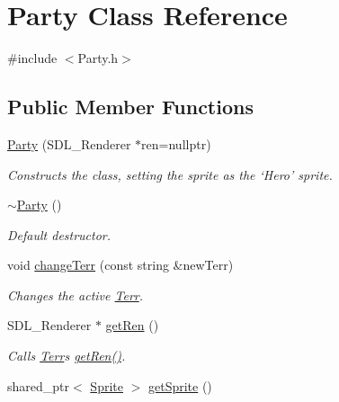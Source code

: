 \hypertarget{class_party}{}\section{Party Class Reference}
\label{class_party}


{\ttfamily \#include $<$Party.\+h$>$}

\subsection*{Public Member Functions}
\begin{DoxyCompactItemize}
\item 
\hyperlink{class_party_a2ac633ed4c5b4171c463a6db02048291}{Party} (S\+D\+L\+\_\+\+Renderer $\ast$ren=nullptr)\hypertarget{class_party_a2ac633ed4c5b4171c463a6db02048291}{}\label{class_party_a2ac633ed4c5b4171c463a6db02048291}

\begin{DoxyCompactList}\small\item\em Constructs the class, setting the sprite as the ‘\+Hero’ sprite. \end{DoxyCompactList}\item 
\hyperlink{class_party_a85aa837e38a06690e6fee5087d7c7ad7}{$\sim$\+Party} ()\hypertarget{class_party_a85aa837e38a06690e6fee5087d7c7ad7}{}\label{class_party_a85aa837e38a06690e6fee5087d7c7ad7}

\begin{DoxyCompactList}\small\item\em Default destructor. \end{DoxyCompactList}\item 
void \hyperlink{class_party_a5b4e7bc4d910ad64722629b2fe365240}{change\+Terr} (const string \&new\+Terr)\hypertarget{class_party_a5b4e7bc4d910ad64722629b2fe365240}{}\label{class_party_a5b4e7bc4d910ad64722629b2fe365240}

\begin{DoxyCompactList}\small\item\em Changes the active \hyperlink{class_terr}{Terr}. \end{DoxyCompactList}\item 
S\+D\+L\+\_\+\+Renderer $\ast$ \hyperlink{class_party_acd791a319c74dcc757fc13c961795688}{get\+Ren} ()\hypertarget{class_party_acd791a319c74dcc757fc13c961795688}{}\label{class_party_acd791a319c74dcc757fc13c961795688}

\begin{DoxyCompactList}\small\item\em Calls \hyperlink{class_terr}{Terr}\textquotesingle{}s \hyperlink{class_party_acd791a319c74dcc757fc13c961795688}{get\+Ren()}. \end{DoxyCompactList}\item 
shared\+\_\+ptr$<$ \hyperlink{class_sprite}{Sprite} $>$ \hyperlink{class_party_a7f8bf409daa7750d0ce103841c437f27}{get\+Sprite} ()\hypertarget{class_party_a7f8bf409daa7750d0ce103841c437f27}{}\label{class_party_a7f8bf409daa7750d0ce103841c437f27}


\end{DoxyCompactItemize}
